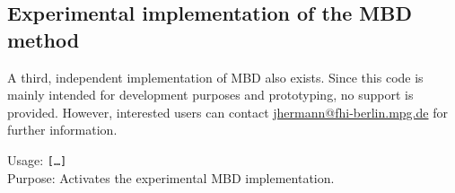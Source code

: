 \subsection*{Experimental implementation of the MBD method}

A third, independent implementation of MBD also exists. Since this code is mainly intended for development purposes and prototyping, no support is provided. However, interested users can contact \href{mailto:jhermann@fhi-berlin.mpg.de?subject=\%5Baims\%20mbd-dev\%5D}{jhermann@fhi-berlin.mpg.de} for further information.

{
  \noindent 
  Usage:  \texttt{[\ldots]} \\[1.0ex]
  Purpose: Activates the experimental MBD implementation. 
}
